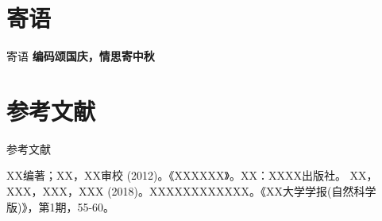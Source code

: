 \documentclass{beamer}
\begin{document}
\section{寄语}
	\begin{frame}{寄语}
		\textbf{ \hspace*{18pt}编码颂国庆，情思寄中秋}
    \end{frame}
    
\section{参考文献}
	\begin{frame}{参考文献}
		\begin{thebibliography}{9}
			XX编著；XX，XX审校 (2012)。《XXXXXX》。XX：XXXX出版社。
			XX，XXX，XXX，XXX (2018)。XXXXXXXXXXXX。《XX大学学报(自然科学版)》，第1期，55-60。
		\end{thebibliography}
	\end{frame}
	
\end{document}
